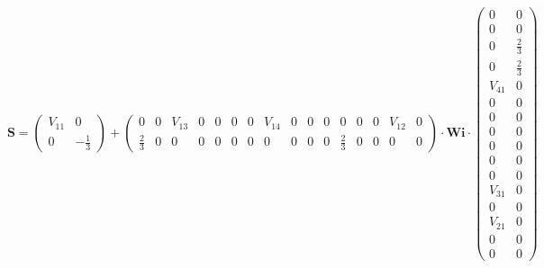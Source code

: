 \[ \mathbf{S} = \left(\begin{smallmatrix} V_{11} & 0 \\ 0 &
-\frac{1}{3} \end{smallmatrix}\right) + \left(\begin{smallmatrix} 0 &
0 & V_{13} & 0 & 0 & 0 & 0 & V_{14} & 0 & 0 & 0 & 0 & 0 & 0 & V_{12} &
0 \\ \frac{2}{3} & 0 & 0 & 0 & 0 & 0 & 0 & 0 & 0 & 0 & 0 & \frac{2}{3}
& 0 & 0 & 0 & 0 \end{smallmatrix}\right) \cdot \mathbf{Wi}
\cdot\left(\begin{smallmatrix} 0 & 0 \\ 0 & 0 \\ 0 & \frac{2}{3} \\ 0
& \frac{2}{3} \\ V_{41} & 0 \\ 0 & 0 \\ 0 & 0 \\ 0 & 0 \\ 0 & 0 \\ 0 &
0 \\ 0 & 0 \\ V_{31} & 0 \\ 0 & 0 \\ V_{21} & 0 \\ 0 & 0 \\ 0 & 0
\end{smallmatrix}\right) \]
